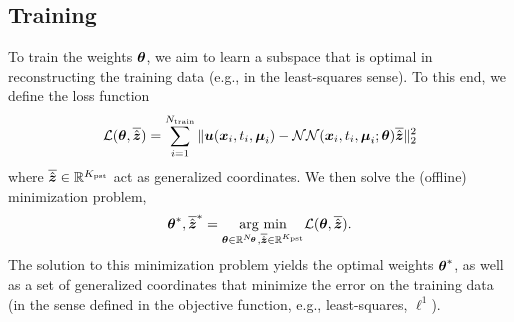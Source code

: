 \documentclass[3p,computermodern,10pt]{elsarticle}
\begin{document}
\subsection{Training}
To train the weights $\boldsymbol \theta$, we aim to learn a subspace that is optimal in reconstructing the training data (e.g., in the least-squares sense). To this end, we define the loss function 
$$\mathcal{L}(\boldsymbol \theta,\overline{\hat{\boldsymbol z}}) = \sum_{i=1}^{N_{\text{train}}} \| \boldsymbol u(\boldsymbol x_i,t_i,\boldsymbol \mu_i) - \mathcal{NN}(\boldsymbol x_i,t_i,\boldsymbol \mu_i;\boldsymbol \theta) \overline{\hat{\boldsymbol z}} \|_2^2$$  
where $\overline{\hat{\boldsymbol z}} \in \mathbb{R}^{K_{\text{pst}}}$ act as generalized coordinates. We then solve the (offline) minimization problem,
\begin{equation}\label{eq:offline_min}
\boldsymbol \theta^*,\overline{\hat{\boldsymbol z}}^* = \underset{ \boldsymbol \theta \in \mathbb{R}^{N_{\boldsymbol \theta}},\overline{\hat{\boldsymbol z}} \in \mathbb{R}^{K_{\text{pst}}}}{\text{arg min}} \mathcal{L}(\boldsymbol \theta,\overline{\hat{\boldsymbol z}}).
\end{equation} 
The solution to this minimization problem yields the optimal weights $\boldsymbol \theta^*$, as well as a set of generalized coordinates that minimize the error on the training data (in the sense defined in the objective function, e.g., least-squares, $\ell^1$).
\end{document}
